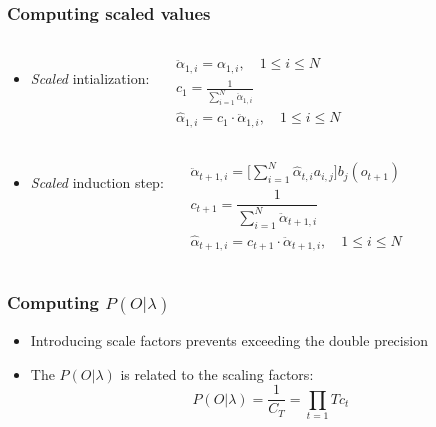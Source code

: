 \begin{frame}
  \frametitle{Computing scaled values}
  \begin{columns}
    \begin{itemize}
    \item \emph{Scaled} intialization:
    \end{itemize}

    \begin{align}[r]
      \ddot{\alpha}_{1,i} = \alpha_{1,i},\quad 1 \le i \le N \\
      c_1 = \frac{1}{\displaystyle\sum_{i=1}^{N} \ddot{\alpha}_{1,i}} \\
      \hat{\alpha}_{1,i} = c_1 \cdot \ddot{\alpha}_{1,i}, \quad 1 \le
      i \le N
    \end{align}
  \end{columns}
  \vspace{.5em} \pause
  \begin{columns}
    \begin{itemize}
    \item \emph{Scaled} induction step:
    \end{itemize}

    \begin{align}[r]
      \ddot{\alpha}_{t+1,i} = \Big[
      \displaystyle\sum_{i=1}^{N}\hat{\alpha}_{t,i}a_{i,j}\Big]
      b_{j}(o_{t+1}) \\
      c_{t+1} = \dfrac{1}{\displaystyle\sum_{i=1}^{N} \ddot{\alpha}_{t+1,i}} \\
      \hat{\alpha}_{t+1,i} = c_{t+1} \cdot \ddot{\alpha}_{t+1,i},
      \quad 1 \le i \le N
    \end{align}

  \end{columns}

\end{frame}

\begin{frame}
  \frametitle{Computing $P(O | \lambda)$}
  \begin{itemize}
  \item Introducing scale factors prevents exceeding the double
    precision
  \item The $P(O \vert \lambda)$ is related to the scaling factors:
    \begin{equation}
      \label{eq:scaled-probability}
      P(O \vert \lambda) = \frac{1}{C_T} = \displaystyle\prod_{t=1}{T}c_t
    \end{equation}
  \end{itemize}
\end{frame}

